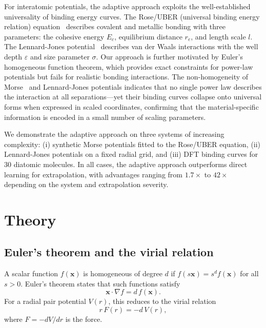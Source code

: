 \documentclass[aps,prb,twocolumn,superscriptaddress,longbibliography,floatfix]{revtex4-2}
\begin{document}
For interatomic potentials, the adaptive approach exploits the well-established universality of binding energy curves. The Rose/UBER (universal binding energy relation) equation~\cite{Rose1984,Ferrante1983} describes covalent and metallic bonding with three parameters: the cohesive energy $E_c$, equilibrium distance $r_e$, and length scale $l$. The Lennard-Jones potential~\cite{LennardJones1924} describes van der Waals interactions with the well depth $\varepsilon$ and size parameter $\sigma$. Our approach is further motivated by Euler's homogeneous function theorem, which provides exact constraints for power-law potentials but fails for realistic bonding interactions. The non-homogeneity of Morse~\cite{Morse1929} and Lennard-Jones potentials indicates that no single power law describes the interaction at all separations---yet their binding curves collapse onto universal forms when expressed in scaled coordinates, confirming that the material-specific information is encoded in a small number of scaling parameters.

We demonstrate the adaptive approach on three systems of increasing complexity: (i) synthetic Morse potentials fitted to the Rose/UBER equation, (ii) Lennard-Jones potentials on a fixed radial grid, and (iii) DFT binding curves for 30 diatomic molecules. In all cases, the adaptive approach outperforms direct learning for extrapolation, with advantages ranging from $1.7\times$ to $42\times$ depending on the system and extrapolation severity.


\section{Theory}
\label{sec:theory}

\subsection{Euler's theorem and the virial relation}
\label{sec:euler}

A scalar function $f(\mathbf{x})$ is homogeneous of degree $d$ if $f(s\mathbf{x}) = s^d f(\mathbf{x})$ for all $s > 0$. Euler's theorem states that such functions satisfy
\begin{equation}
  \mathbf{x} \cdot \nabla f = d\, f(\mathbf{x}).
  \label{eq:euler}
\end{equation}
For a radial pair potential $V(r)$, this reduces to the virial relation
\begin{equation}
  r\, F(r) = -d\, V(r),
  \label{eq:virial}
\end{equation}
where $F = -dV/dr$ is the force.
\end{document}
